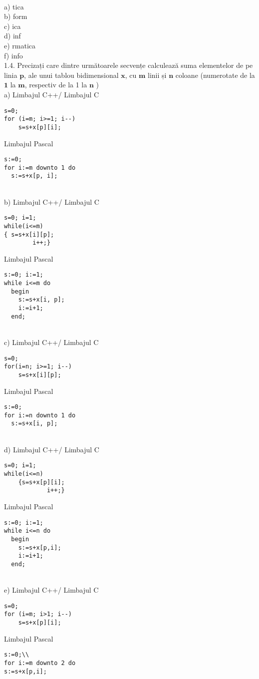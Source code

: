 \\
a) tica
\\
b) form
\\
c) ica
\\
d) inf
\\
e) rmatica
\\
f) info
\\
1.4. Precizați care dintre următoarele secvențe calculează suma elementelor de pe linia $\mathbf{p}$, ale unui tablou bidimensional $\mathbf{x}$, cu $\mathbf{m}$ linii și $\mathbf{n}$ coloane (numerotate de la $\mathbf{1}$ la $\mathbf{m}$, respectiv de la 1 la $\mathbf{n}$ )
\\
a) Limbajul C++/ Limbajul C
\begin{verbatim}
s=0;
for (i=m; i>=1; i--)
    s=s+x[p][i];
\end{verbatim}
Limbajul Pascal
\begin{verbatim}
s:=0;
for i:=m downto 1 do
  s:=s+x[p, i];
\end{verbatim}
\\
b) Limbajul C++/ Limbajul C
\begin{verbatim}
s=0; i=1;
while(i<=m)
{ s=s+x[i][p];
        i++;}
\end{verbatim}
Limbajul Pascal
\begin{verbatim}
s:=0; i:=1;
while i<=m do
  begin
    s:=s+x[i, p];
    i:=i+1;
  end;
\end{verbatim}
\\
c) Limbajul C++/ Limbajul C
\begin{verbatim}
s=0;
for(i=n; i>=1; i--)
    s=s+x[i][p];
\end{verbatim}
Limbajul Pascal
\begin{verbatim}
s:=0;
for i:=n downto 1 do
  s:=s+x[i, p];
\end{verbatim}
\\
d) Limbajul C++/ Limbajul C
\begin{verbatim}
s=0; i=1;
while(i<=n)
    {s=s+x[p][i];
            i++;}
\end{verbatim}
Limbajul Pascal
\begin{verbatim}
s:=0; i:=1;
while i<=n do
  begin
    s:=s+x[p,i];
    i:=i+1;
  end;
\end{verbatim}
\\
e) Limbajul C++/ Limbajul C
\begin{verbatim}
s=0;
for (i=m; i>1; i--)
    s=s+x[p][i];
\end{verbatim}
Limbajul Pascal
\begin{verbatim}
s:=0;\\
for i:=m downto 2 do
s:=s+x[p,i];
\end{verbatim}
